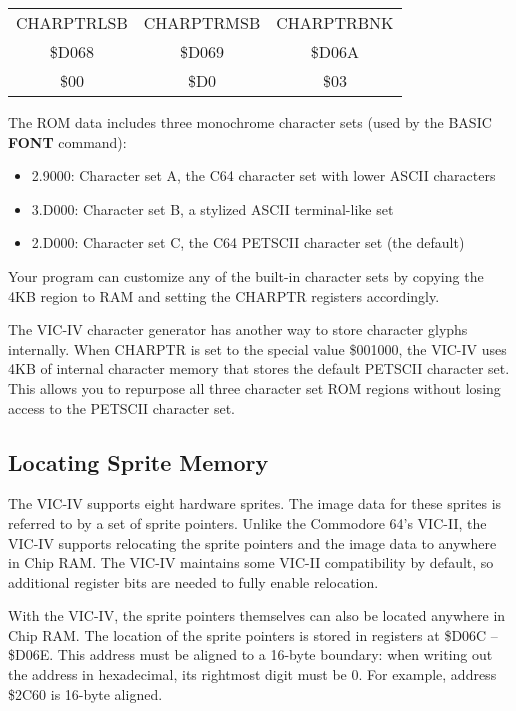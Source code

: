\begin{center}
\begin{tabular}{|c|c|c|}
\hline
CHARPTRLSB & CHARPTRMSB & CHARPTRBNK \\
\$D068 & \$D069 & \$D06A \\
\hline
\$00 & \$D0 & \$03 \\
\hline
\end{tabular}
\end{center}

The ROM data includes three monochrome character sets (used by the BASIC {\bf
FONT} command):

\begin{itemize}
\item 2.9000: Character set A, the C64 character set with lower ASCII characters
\item 3.D000: Character set B, a stylized ASCII terminal-like set
\item 2.D000: Character set C, the C64 PETSCII character set (the default)
\end{itemize}

Your program can customize any of the built-in character sets by copying the
4KB region to RAM and setting the CHARPTR registers accordingly.

The VIC-IV character generator has another way to store character glyphs
internally. When CHARPTR is set to the special value \$001000, the VIC-IV uses
4KB of internal character memory that stores the default PETSCII character set. This
allows you to repurpose all three character set ROM regions without losing access
to the PETSCII character set.

\subsection{Locating Sprite Memory}

The VIC-IV supports eight hardware sprites. The image data for these sprites is
referred to by a set of sprite pointers. Unlike the Commodore 64's VIC-II, the
VIC-IV supports relocating the sprite pointers and the image data to anywhere
in Chip RAM. The VIC-IV maintains some VIC-II compatibility by default, so
additional register bits are needed to fully enable relocation.

With the VIC-IV, the sprite pointers themselves can also be located anywhere
in Chip RAM. The location of the sprite pointers is stored in registers at
\$D06C -- \$D06E. This address must be aligned to a 16-byte boundary: when
writing out the address in hexadecimal, its rightmost digit must be 0. For
example, address \$2C60 is 16-byte aligned.

